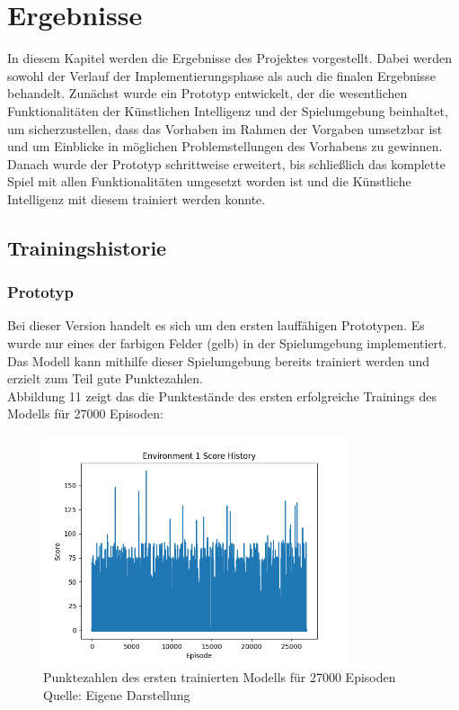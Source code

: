 \section{Ergebnisse}
In diesem Kapitel werden die Ergebnisse des Projektes vorgestellt. Dabei werden sowohl der Verlauf der Implementierungsphase als auch die finalen Ergebnisse behandelt. Zunächst wurde ein Prototyp entwickelt, der die wesentlichen Funktionalitäten der Künstlichen Intelligenz und der Spielumgebung beinhaltet, um sicherzustellen, dass das Vorhaben im Rahmen der Vorgaben umsetzbar ist und um Einblicke in möglichen Problemstellungen des Vorhabens zu gewinnen. Danach wurde der Prototyp schrittweise erweitert, bis schließlich das komplette Spiel mit allen Funktionalitäten umgesetzt worden ist und die Künstliche Intelligenz mit diesem trainiert werden konnte.
\subsection{Trainingshistorie}
\subsubsection{Prototyp}
Bei dieser Version handelt es sich um den ersten lauffähigen Prototypen. Es wurde nur eines der farbigen Felder (gelb) in der Spielumgebung implementiert. Das Modell kann mithilfe dieser Spielumgebung bereits trainiert werden und erzielt zum Teil gute Punktezahlen.\\

Abbildung 11 zeigt das die Punktestände des ersten erfolgreiche Trainings des Modells für 27000 Episoden:
\nopagebreak
\begin{figure}[H]
	\centering
	\includegraphics[width=0.8\textwidth]{Bilder/firstpropertraining} 
	\caption[Punktezahlen des ersten trainierten Modells für 27000 Episoden]{Punktezahlen des ersten trainierten Modells für 27000 Episoden\\ Quelle: Eigene Darstellung}
\end{figure}

